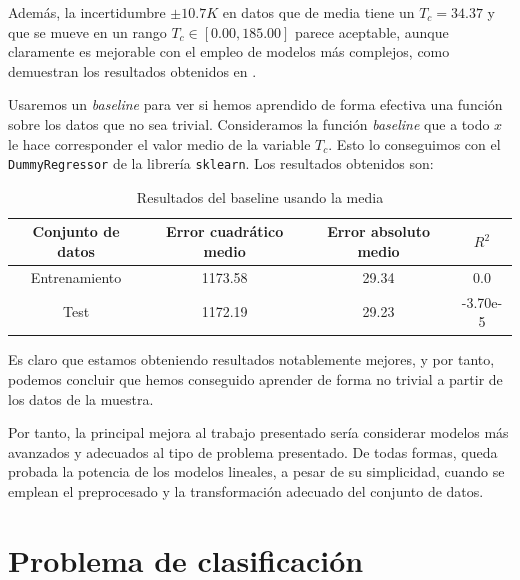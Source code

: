 \documentclass[11pt]{article}
\begin{document}
Además, la incertidumbre $\pm 10.7 K$ en datos que de media tiene un $T_c = 34.37$ y que se mueve en un rango $T_c \in [0.00, 185.00]$ parece aceptable, aunque claramente es mejorable con el empleo de modelos más complejos, como demuestran los resultados obtenidos en \cite{original_paper_reg:paper}.

Usaremos un \emph{baseline} para ver si hemos aprendido de forma efectiva una función sobre los datos que no sea trivial. Consideramos la función \emph{baseline} que a todo $x$ le hace corresponder el valor medio de la variable $T_c$. Esto lo conseguimos con el \lstinline{DummyRegressor} de la librería \lstinline{sklearn}. Los resultados obtenidos son:

\begin{table}[H]
\centering
\begin{tabular}{|c|c|c|c|}
    \hline
    \textbf{Conjunto de datos} & \textbf{Error cuadrático medio} & \textbf{Error absoluto medio} & \textbf{$R^2$} \\
    \hline
    Entrenamiento & 1173.58 & 29.34 &  0.0 \\
    Test & 1172.19 & 29.23 & -3.70e-5 \\
    \hline
\end{tabular}
    \caption{Resultados del baseline usando la media}
\end{table}

Es claro que estamos obteniendo resultados notablemente mejores, y por tanto, podemos concluir que hemos conseguido aprender de forma no trivial a partir de los datos de la muestra.

Por tanto, la principal mejora al trabajo presentado sería considerar modelos más avanzados y adecuados al tipo de problema presentado. De todas formas, queda probada la potencia de los modelos lineales, a pesar de su simplicidad, cuando se emplean el preprocesado y la transformación adecuado del conjunto de datos.

\pagebreak
\section{Problema de clasificación}

\pagebreak



\end{document}

